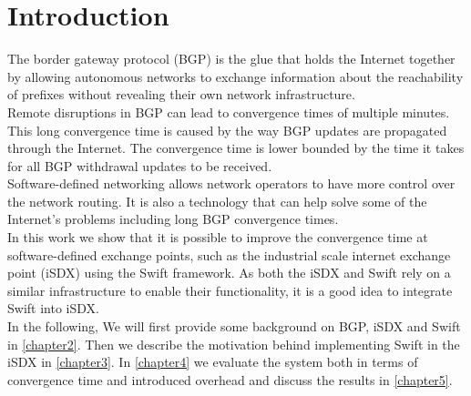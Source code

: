 

\chapter{\label{introduction}Introduction}
The border gateway protocol (BGP) is the glue that holds the Internet together by allowing autonomous networks to exchange information about the reachability of prefixes without revealing their own network infrastructure. \\
Remote disruptions in BGP can lead to convergence times of multiple minutes. This long convergence time is caused by the way BGP updates are propagated through the Internet. The convergence time is lower bounded by the time it takes for all BGP withdrawal updates to be received. \\
Software-defined networking allows network operators to have more control over the network routing. It is also a technology that can help solve some of the Internet's problems including long BGP convergence times. \\
In this work we show that it is possible to improve the convergence time at software-defined exchange points, such as the industrial scale internet exchange point (iSDX) using the Swift framework. As both the iSDX and Swift rely on a similar infrastructure to enable their functionality, it is a good idea to integrate Swift into iSDX. \\
In the following, We will first provide some background on BGP, iSDX and Swift in \ref{chapter2}. Then we describe the motivation behind implementing Swift in the iSDX in \ref{chapter3}. In \ref{chapter4} we evaluate the system both in terms of convergence time and introduced overhead and discuss the results in \ref{chapter5}. 



